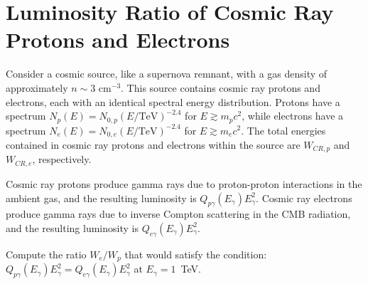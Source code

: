 \section{Luminosity Ratio of Cosmic Ray Protons and Electrons}

Consider a cosmic source, like a supernova remnant, with a gas density of approximately \(n \sim 3 \) cm\(^{-3}\). This source contains cosmic ray protons and electrons, each with an identical spectral energy distribution. Protons have a spectrum \(N_p(E) = N_{0, p} (E/\text{TeV})^{-2.4}\) for \(E \gtrsim m_p c^2\), while electrons have a spectrum \(N_e(E) = N_{0, e} (E/\text{TeV})^{-2.4}\) for \(E \gtrsim m_e c^2\). 
%
The total energies contained in cosmic ray protons and electrons within the source are \(W_{CR, p}\) and \(W_{CR, e}\), respectively.

Cosmic ray protons produce gamma rays due to proton-proton interactions in the ambient gas, and the resulting luminosity is \(Q_{p\gamma}(E_\gamma)E_\gamma^2\). Cosmic ray electrons produce gamma rays due to inverse Compton scattering in the CMB radiation, and the resulting luminosity is \(Q_{e\gamma}(E_\gamma)E_\gamma^2\).

Compute the ratio \( W_e / W_p \) that would satisfy the condition: \(Q_{p\gamma}(E_\gamma)E_\gamma^2 = Q_{e\gamma}(E_\gamma)E_\gamma^2\) at \( E_\gamma = 1 \)~TeV.